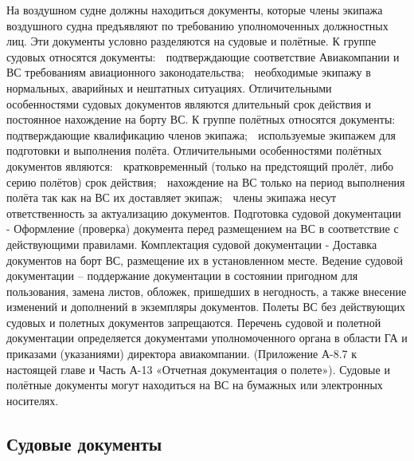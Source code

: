 На воздушном судне должны находиться документы, которые члены экипажа воздушного судна предъявляют по требованию уполномоченных должностных лиц. Эти документы условно разделяются на судовые и полётные.
К группе судовых относятся документы:
	подтверждающие соответствие Авиакомпании и ВС требованиям авиационного законодательства;
	необходимые экипажу в нормальных, аварийных и нештатных ситуациях.
Отличительными особенностями судовых документов являются длительный срок действия и постоянное нахождение на борту ВС.
К группе полётных относятся документы:
	подтверждающие квалификацию членов экипажа;
	используемые экипажем для подготовки и выполнения полёта.
Отличительными особенностями полётных документов являются:
	кратковременный (только на предстоящий пролёт, либо серию полётов) срок действия;
	нахождение на ВС только на период выполнения полёта так как на ВС их доставляет экипаж;
	члены экипажа несут ответственность за актуализацию документов. 
Подготовка судовой документации - Оформление (проверка) документа перед размещением на ВС в соответствие с действующими правилами.
Комплектация судовой документации - Доставка документов на борт ВС, размещение их в установленном месте.
Ведение судовой документации – поддержание документации в состоянии пригодном для пользования, замена листов, обложек, пришедших в негодность, а также внесение изменений и дополнений в экземпляры документов.
Полеты ВС без действующих судовых и полетных документов запрещаются.
Перечень судовой и полетной документации определяется документами уполномоченного органа в области ГА и приказами (указаниями) директора авиакомпании. (Приложение А-8.7 к настоящей главе и Часть А-13 «Отчетная документация о полете»). 
Судовые и полётные документы могут находиться на ВС на бумажных или электронных носителях.

\subsection{Судовые документы}

